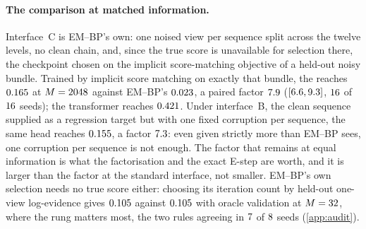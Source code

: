 \paragraph{The comparison at matched information.}
Interface~C is EM--BP's own: one noised view per sequence split across the twelve levels,
no clean chain, and, since the true score is unavailable for selection there, the
checkpoint chosen on the implicit score-matching objective of a held-out noisy bundle.
Trained by implicit score matching on exactly that bundle, the \matchedBestArchD{} reaches
$0.165$ at $M=2048$ against EM--BP's $0.023$, a paired factor
$7.9$ ($[6.6,9.3]$, $16$ of
$16$ seeds); the transformer reaches $0.421$. Under
interface~B, the clean sequence supplied as a regression target but with one fixed
corruption per sequence, the same head reaches $0.155$, a factor
$7.3$: even given strictly more than EM--BP sees, one corruption per
sequence is not enough. The factor that remains at equal information is what the
factorisation and the exact E-step are worth, and it is larger than the factor at the
standard interface, not smaller. EM--BP's own selection needs no true score either:
choosing its iteration count by held-out one-view log-evidence gives $0.105$
against $0.105$ with oracle validation at $M=32$, where the rung matters
most, the two rules agreeing in $7$ of $8$ seeds (\cref{app:audit}).

